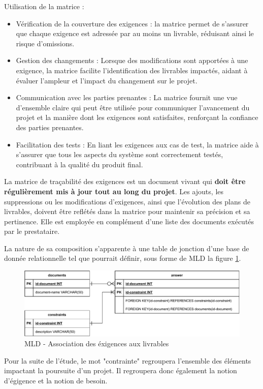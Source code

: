 \documentclass[a4paper,12pt]{article}
\begin{document}
Utilisation de la matrice :
\begin{itemize}
\item Vérification de la couverture des exigences : la matrice permet de s'assurer que chaque exigence est adressée par au moins un livrable, réduisant ainsi le risque d'omissions.
\item Gestion des changements : Lorsque des modifications sont apportées à une exigence, la matrice facilite l'identification des livrables impactés, aidant à évaluer l'ampleur et l'impact du changement sur le projet.
\item Communication avec les parties prenantes : La matrice fournit une vue d'ensemble claire qui peut être utilisée pour communiquer l'avancement du projet et la manière dont les exigences sont satisfaites, renforçant la confiance des parties prenantes.
\item Facilitation des tests : En liant les exigences aux cas de test, la matrice aide à s'assurer que tous les aspects du système sont correctement testés, contribuant à la qualité du produit final.
\end{itemize}

La matrice de traçabilité des exigences est un document vivant qui \textbf{doit être régulièrement mis à jour tout au long du projet}. Les ajouts, les suppressions ou les modifications d'exigences, ainsi que l'évolution des plans de livrables, doivent être reflétés dans la matrice pour maintenir sa précision et sa pertinence.
Elle est employée en complément d'une liste des documents exécutés par le prestataire.

La nature de sa composition s'apparente à une table de jonction d'une base de donnée relationnelle tel que pourrait définir, sous forme de MLD la figure \ref{fig:orgcc8dbf8}.

\begin{figure}[htbp]
\centering
\includegraphics[width=.9\linewidth]{./svg/db-exigences-lde.pdf}
\caption{\label{fig:orgcc8dbf8}MLD - Association des éxigences aux livrables}
\end{figure}

Pour la suite de l'étude, le mot "contrainte" regroupera l'ensemble des éléments impactant la poursuite d'un projet. Il regroupera donc également la notion d'égigence et la notion de besoin.
\end{document}
